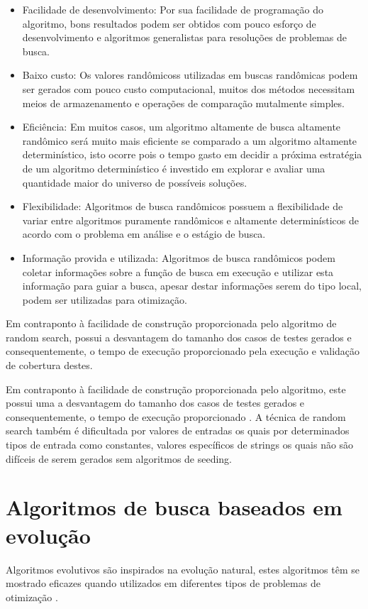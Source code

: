 \documentclass[
	12pt,				%
	oneside,			%
	a4paper,			%
	english,			%
	brazil				%
	]{abntex2ppgsi}
\begin{document}
\begin{itemize}
	\item Facilidade de desenvolvimento: Por sua facilidade de programação do algoritmo, bons resultados podem ser obtidos com pouco esforço de desenvolvimento e algoritmos generalistas para resoluções de problemas de busca.
	\item Baixo custo: Os valores randômicoss utilizadas em buscas randômicas podem ser gerados com pouco custo computacional, muitos dos métodos necessitam meios de armazenamento e operações de comparação mutalmente simples.
	\item Eficiência: Em muitos casos, um algoritmo altamente de busca altamente randômico será muito mais eficiente se comparado a um algoritmo altamente determinístico, isto ocorre pois o tempo gasto em decidir a próxima estratégia de um algoritmo determinístico é investido em explorar e avaliar uma quantidade maior do universo de possíveis soluções.
	\item Flexibilidade: Algoritmos de busca randômicos possuem a flexibilidade de variar entre algoritmos puramente randômicos e altamente determinísticos de acordo com o problema em análise e o estágio de busca.
	\item Informação provida e utilizada: Algoritmos de busca randômicos podem coletar informações sobre a função de busca em execução e utilizar esta informação para guiar a busca, apesar destar informações serem do tipo local, podem ser utilizadas para otimização.
\end{itemize}


Em contraponto à facilidade de construção proporcionada pelo algoritmo de random search, possui a desvantagem do tamanho dos casos de testes gerados e consequentemente, o tempo de execução proporcionado pela execução e validação de cobertura destes. \cite{shamriski20151115}


Em contraponto à facilidade de construção proporcionada pelo algoritmo, este possui uma a desvantagem do tamanho dos casos de testes gerados e consequentemente, o tempo de execução proporcionado \cite{shamriski20151115}. A técnica de random search também é dificultada por valores de entradas os quais por determinados tipos de entrada como constantes, valores específicos de strings os quais não são difíceis de serem gerados sem algoritmos de seeding. \cite{shamriski20151115}


\section{Algoritmos de busca baseados em evolução}
Algoritmos evolutivos são inspirados na evolução natural, estes algoritmos têm se mostrado eficazes quando utilizados em diferentes tipos de problemas de otimização \cite{Campos2017}.
\end{document}
